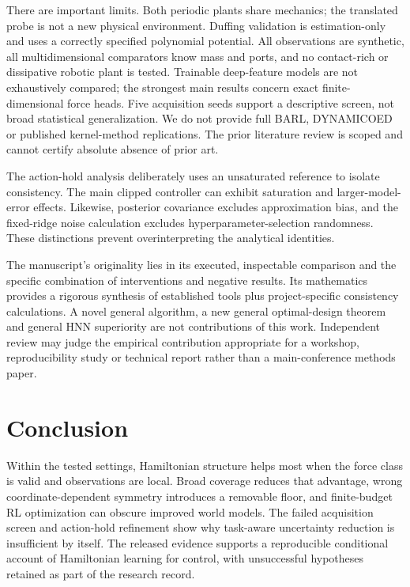 \documentclass[
  10pt,
]{article}
\begin{document}
There are important limits. Both periodic plants share mechanics; the
translated probe is not a new physical environment. Duffing validation
is estimation-only and uses a correctly specified polynomial potential.
All observations are synthetic, all multidimensional comparators know
mass and ports, and no contact-rich or dissipative robotic plant is
tested. Trainable deep-feature models are not exhaustively compared; the
strongest main results concern exact finite-dimensional force heads.
Five acquisition seeds support a descriptive screen, not broad
statistical generalization. We do not provide full BARL, DYNAMICOED or
published kernel-method replications. The prior literature review is
scoped and cannot certify absolute absence of prior art.

The action-hold analysis deliberately uses an unsaturated reference to
isolate consistency. The main clipped controller can exhibit saturation
and larger-model-error effects. Likewise, posterior covariance excludes
approximation bias, and the fixed-ridge noise calculation excludes
hyperparameter-selection randomness. These distinctions prevent
overinterpreting the analytical identities.

The manuscript's originality lies in its executed, inspectable
comparison and the specific combination of interventions and negative
results. Its mathematics provides a rigorous synthesis of established
tools plus project-specific consistency calculations. A novel general
algorithm, a new general optimal-design theorem and general HNN
superiority are not contributions of this work. Independent review may
judge the empirical contribution appropriate for a workshop,
reproducibility study or technical report rather than a main-conference
methods paper.

\hypertarget{conclusion}{%
\section{Conclusion}\label{conclusion}}

Within the tested settings, Hamiltonian structure helps most when the
force class is valid and observations are local. Broad coverage reduces
that advantage, wrong coordinate-dependent symmetry introduces a
removable floor, and finite-budget RL optimization can obscure improved
world models. The failed acquisition screen and action-hold refinement
show why task-aware uncertainty reduction is insufficient by itself. The
released evidence supports a reproducible conditional account of
Hamiltonian learning for control, with unsuccessful hypotheses retained
as part of the research record.
\end{document}
